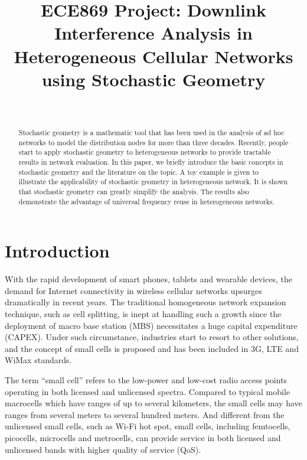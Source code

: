 \documentclass[a4paper,twocolumn]{IEEEtran}
\begin{document}
\title{ECE869 Project: Downlink Interference Analysis in Heterogeneous Cellular Networks using Stochastic Geometry}
\author{\\
	\vspace{6pt}
	}
\maketitle

\begin{abstract}
	Stochastic geometry is a mathematic tool that has been used in the analysis of ad hoc networks to model the distribution nodes for more than three decades. Recently, people start to apply stochastic geometry to heterogeneous networks to provide tractable results in network evaluation. In this paper, we briefly introduce the basic concepts in stochastic geometry and the literature on the topic. A toy example is given to illustrate the applicability of stochastic geometry in heterogeneous network. It is shown that stochastic geometry can greatly simplify the analysis. The results also demonstrate the advantage of universal frequency reuse in heterogeneous networks.
\end{abstract}

\section{Introduction}
With the rapid development of smart phones, tablets and wearable devices, the demand for Internet connectivity in wireless cellular networks upsurges dramatically in recent years. The traditional homogeneous network expansion technique, such as cell splitting, is inept at handling such a growth since the deployment of macro base station (MBS) necessitates a huge capital expenditure (CAPEX). Under such circumstance, industries start to resort to other solutions, and the concept of small cells is proposed and has been included in 3G, LTE and WiMax standards\cite{Lin2011}.

The term ``small cell'' refers to the low-power and low-cost radio access points operating in both licensed and unlicensed spectra. Compared to typical mobile macrocells which have ranges of up to several kilometers, the small cells may have ranges from several meters to several hundred meters. And different from the unlicensed small cells, such as Wi-Fi hot spot, small cells, including femtocells, picocells, microcells and metrocells, can provide service in both licensed and unlicensed bands with higher quality of service (QoS).
\end{document}
